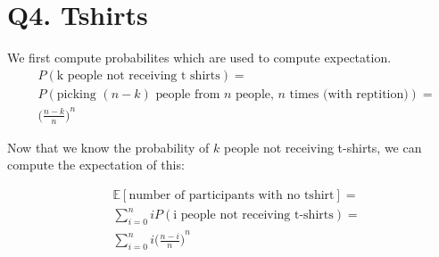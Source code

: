 \documentclass{article}
\begin{document}
\section{Q4. Tshirts}

We first compute probabilites which are used to compute expectation.
\begin{align*}
&P(\text{k people not receiving t shirts}) = \\
&P(\text{picking $(n - k)$ people from $n$ people, $n$ times (with reptition)}) = \\
&{\bigg(\frac{n - k}{n}\bigg)}^n
\end{align*}

Now that we know the probability of $k$ people not receiving t-shirts, we can
compute the expectation of this:

\begin{align*}
&\mathbb{E}[\text{number of participants with no tshirt}] =  \\
&\sum_{i = 0}^n i  P(\text{i people not receiving t-shirts}) = \\
&\sum_{i = 0}^n i {\bigg(\frac{n - i}{n}\bigg)}^n 
\end{align*}
\end{document}
